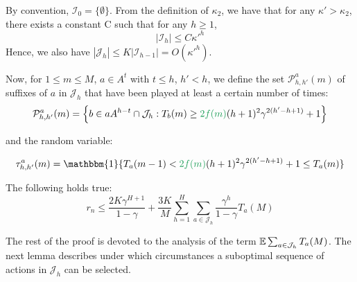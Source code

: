\documentclass[runningheads]{llncs}
\newcommand{\diff}[1]{\textcolor{ForestGreen}{#1}}
\begin{document}
By convention, $\mathcal{I}_0 = \{\emptyset\}$. From the definition of $\kappa_2$, we have that for any $\kappa'>\kappa_2$, there exists a constant C such that for any $h \geq 1$,
\begin{equation*}
    |\mathcal{I}_h| \leq C {\kappa'}^h
\end{equation*}
Hence, we also have $|\mathcal{J}_h| \leq K|\mathcal{I}_{h-1}| = O({\kappa'}^h)$.

Now, for $1\leq m \leq M$, $a \in A^t$ with $t \leq h$, $h'<h$, we define the set $\mathcal{P}^a_{h,h'}(m)$ of suffixes of $a$ in $\mathcal{J}_h$ that have been played at least a certain number of times:
\begin{equation*}
    \mathcal{P}^a_{h,h'}(m) = \left\{ b\in a A^{h-t}\cap \mathcal{J}_h : T_b(m) \geq \diff{2f(m)}(h+1)^2\gamma^{2(h'-h+1)} + 1 \right\}
\end{equation*}

and the random variable:

\begin{equation*}
    \tau^a_{h,h'}(m) = \mathbbm{1}\{T_a(m-1) < \diff{2f(m)}(h+1)^2\gamma^{2(h'-h+1)} + 1 \leq T_a(m)\}
\end{equation*}

\begin{lemma}
\label{lemma:expected-regret}
The following holds true:
\begin{equation*}
    r_n \leq \frac{2K \gamma^{H+1}}{1-\gamma} +\frac{3K}{M}\sum_{h=1}^H\sum_{a\in\mathcal{J}_h}\frac{\gamma^h}{1-\gamma}T_a(M)
\end{equation*}
\end{lemma}


The rest of the proof is devoted to the analysis of the term $\operatorname*{\mathbb{E}} \sum_{a\in \mathcal{J}_h} T_a(M)$. The next lemma describes under which circumstances a suboptimal sequence of actions in $\mathcal{J}_h$ can be selected.
\end{document}
